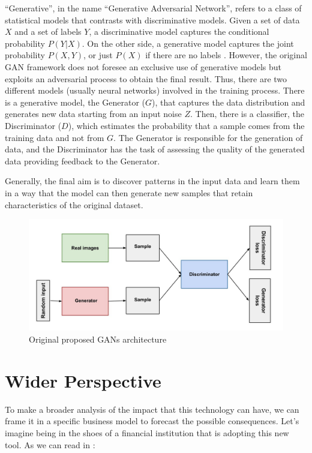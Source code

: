 \documentclass[runningheads]{llncs}
\begin{document}
“Generative”, in the name “Generative Adversarial Network”, refers to a class of statistical models that contrasts with discriminative models. Given a set of data $X$ and a set of labels $Y$, a discriminative model captures the conditional probability $P(Y|X)$. On the other side, a generative model captures the joint probability $P(X, Y)$, or just $P(X)$ if there are no labels \cite{jebara_2004}. However, the original GAN framework does not foresee an exclusive use of generative models but exploits an adversarial process to obtain the final result. Thus, there are two different models (usually neural networks) involved in the training process. There is a generative model, the Generator ($G$), that captures the data distribution and generates new data starting from an input noise $Z$. Then, there is a classifier, the Discriminator ($D$), which estimates the probability that a sample comes from the training data and not from $G$. The Generator is responsible for the generation of data, and the Discriminator has the task of assessing the quality of the generated data providing feedback to the Generator.

Generally, the final aim is to discover patterns in the input data and learn them in a way that the model can then generate new samples that retain characteristics of the original dataset.

\begin{figure}
\includegraphics[width=\textwidth]{gan_diagram.jpg}
\caption{Original proposed GANs architecture}
\end{figure}

\section{Wider Perspective}\label{wider}
To make a broader analysis of the impact that this technology can have, we can frame it in a specific business model to forecast the possible consequences. Let’s imagine being in the shoes of a financial institution that is adopting this new tool. As we can read in \cite{dilmegani_2021}:
\end{document}
